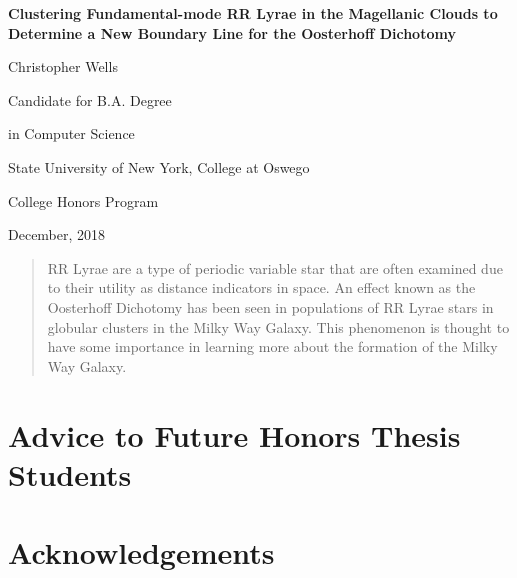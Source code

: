 \documentclass[]{article}
\title{}
\author{Christopher Wells}
\begin{document}
\begin{center}
	\vspace*{200pt}
	
	\textbf{Clustering Fundamental-mode RR Lyrae in the Magellanic Clouds to Determine a New Boundary Line for the Oosterhoff Dichotomy}
	
	\vspace{20pt}
	
	Christopher Wells
	
	Candidate for B.A. Degree
	
	in Computer Science
	
	\vspace{20pt}
	
	State University of New York, College at Oswego
	
	College Honors Program
	
	\vspace{20pt}
	
	December, 2018
\end{center}

\newpage

\singlespacing

\begin{abstract}
	
	RR Lyrae are a type of periodic variable star that are often examined due to their utility as distance indicators in space. An effect known as the Oosterhoff Dichotomy has been seen in populations of RR Lyrae stars in globular clusters in the Milky Way Galaxy. This phenomenon is thought to have some importance in learning more about the formation of the Milky Way Galaxy.

\end{abstract}

\newpage

\doublespacing

\tableofcontents

\newpage


\section{Advice to Future Honors Thesis Students}

\newpage

\section{Acknowledgements}
\end{document}
